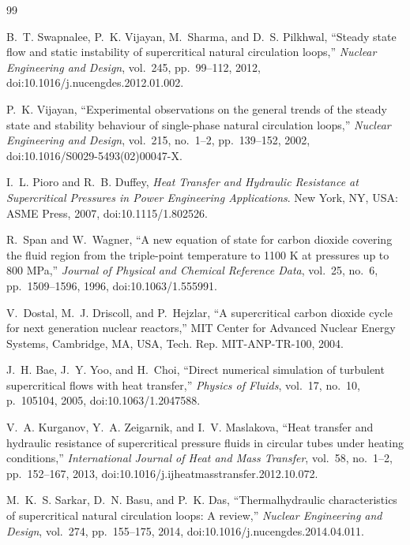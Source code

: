 \documentclass[11pt]{article}
\begin{document}
\begin{thebibliography}{99}\small\setlength{\itemsep}{1pt}\setlength{\parskip}{0pt}

B.~T. Swapnalee, P.~K. Vijayan, M.~Sharma, and D.~S. Pilkhwal, ``Steady state flow and static instability of supercritical natural circulation loops,'' \emph{Nuclear Engineering and Design}, vol.~245, pp.~99--112, 2012, doi:10.1016/j.nucengdes.2012.01.002.

P.~K. Vijayan, ``Experimental observations on the general trends of the steady state and stability behaviour of single-phase natural circulation loops,'' \emph{Nuclear Engineering and Design}, vol.~215, no.~1--2, pp.~139--152, 2002, doi:10.1016/S0029-5493(02)00047-X.

I.~L. Pioro and R.~B. Duffey, \emph{Heat Transfer and Hydraulic Resistance at Supercritical Pressures in Power Engineering Applications}. New York, NY, USA: ASME Press, 2007, doi:10.1115/1.802526.

R.~Span and W.~Wagner, ``A new equation of state for carbon dioxide covering the fluid region from the triple-point temperature to 1100 K at pressures up to 800 MPa,'' \emph{Journal of Physical and Chemical Reference Data}, vol.~25, no.~6, pp.~1509--1596, 1996, doi:10.1063/1.555991.

V.~Dostal, M.~J. Driscoll, and P.~Hejzlar, ``A supercritical carbon dioxide cycle for next generation nuclear reactors,'' MIT Center for Advanced Nuclear Energy Systems, Cambridge, MA, USA, Tech. Rep. MIT-ANP-TR-100, 2004.

J.~H. Bae, J.~Y. Yoo, and H.~Choi, ``Direct numerical simulation of turbulent supercritical flows with heat transfer,'' \emph{Physics of Fluids}, vol.~17, no.~10, p.~105104, 2005, doi:10.1063/1.2047588.

V.~A. Kurganov, Y.~A. Zeigarnik, and I.~V. Maslakova, ``Heat transfer and hydraulic resistance of supercritical pressure fluids in circular tubes under heating conditions,'' \emph{International Journal of Heat and Mass Transfer}, vol.~58, no.~1--2, pp.~152--167, 2013, doi:10.1016/j.ijheatmasstransfer.2012.10.072.

M.~K.~S. Sarkar, D.~N. Basu, and P.~K. Das, ``Thermalhydraulic characteristics of supercritical natural circulation loops: A review,'' \emph{Nuclear Engineering and Design}, vol.~274, pp.~155--175, 2014, doi:10.1016/j.nucengdes.2014.04.011.


\end{thebibliography}
\end{document}
